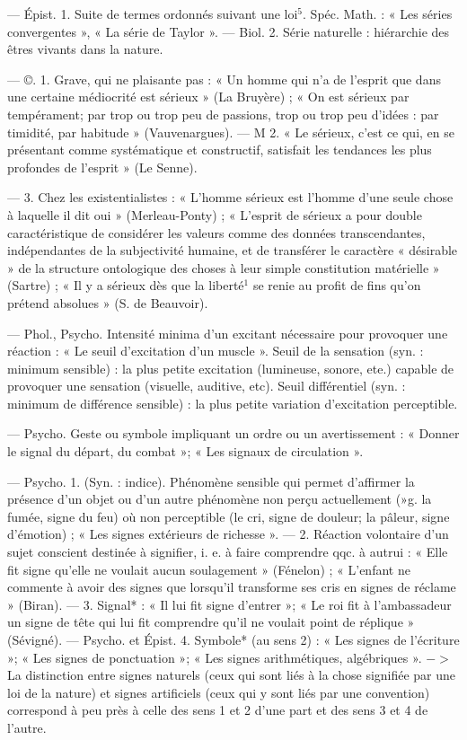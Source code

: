 \begin{itemize}[leftmargin=1cm, label=, itemsep=1pt]
 — Épist. 1. Suite de termes
ordonnés suivant une loi$^5$. Spéc.
Math. : « Les séries convergentes »,
« La série de Taylor ». — Biol. 2.
Série naturelle : hiérarchie des êtres
vivants dans la nature.

 — ©. 1. Grave, qui ne plaisante pas : « Un homme qui n’a de
l'esprit que dans une certaine médiocrité est sérieux » (La Bruyère) ;
« On est sérieux par tempérament;
par trop ou trop peu de passions,
trop ou trop peu d'idées : par timidité, par habitude » (Vauvenargues).
— M 2. « Le sérieux, c’est ce qui, en
se présentant comme systématique
et constructif, satisfait les tendances
les plus profondes de l'esprit » (Le
Senne).

— 3. Chez les existentialistes :
« L'homme sérieux est l’homme d’une
seule chose à laquelle il dit oui » (Merleau-Ponty) ; « L'esprit de sérieux a
pour double caractéristique de considérer les valeurs comme des données
transcendantes, indépendantes de
la subjectivité humaine, et de transférer le caractère « désirable » de la
structure ontologique des choses à
leur simple constitution matérielle »
(Sartre) ; « Il y a sérieux dès que la
liberté$^1$ se renie au profit de fins
qu'on prétend absolues » (S. de
Beauvoir).

 — Phol., Psycho. Intensité minima d’un excitant nécessaire pour
provoquer une réaction : « Le seuil
d’excitation d'un muscle ». Seuil de
la sensation (syn. : minimum sensible) : la plus petite excitation
(lumineuse, sonore, ete.) capable de
provoquer une sensation (visuelle,
auditive, etc). Seuil différentiel
(syn. : minimum de différence sensible) :
la plus petite variation d’excitation perceptible.

 — Psycho. Geste ou symbole
impliquant un ordre ou un avertissement : « Donner le signal du départ,
du combat »; « Les signaux de circulation ».

 — Psycho. 1. (Syn. : indice).
Phénomène sensible qui permet
d'affirmer la présence d’un objet
ou d’un autre phénomène non perçu
actuellement (»g. la fumée, signe
du feu) où non perceptible (le cri,
signe de douleur; la pâleur, signe
d'émotion) ; « Les signes extérieurs
de richesse ». — 2. Réaction volontaire d’un sujet conscient destinée à
signifier, i. e. à faire comprendre
qqc. à autrui : « Elle fit signe qu’elle
ne voulait aucun soulagement »
(Fénelon) ; « L’enfant ne commente
à avoir des signes que lorsqu'il
transforme ses cris en signes de
réclame » (Biran). — 3. Signal* :
« Il lui fit signe d'entrer »; « Le roi
fit à l'ambassadeur un signe de tête
qui lui fit comprendre qu'il ne voulait point de réplique » (Sévigné). —
Psycho. et Épist. 4. Symbole* (au
sens 2) : « Les signes de l’écriture »;
« Les signes de ponctuation »; « Les
signes arithmétiques, algébriques ».
$->$ La distinction entre signes
naturels (ceux qui sont liés à la chose
signifiée par une loi de la nature) et
signes artificiels (ceux qui y sont
liés par une convention) correspond
à peu près à celle des sens 1 et 2
d’une part et des sens 3 et 4 de
l'autre.


\end{itemize}
